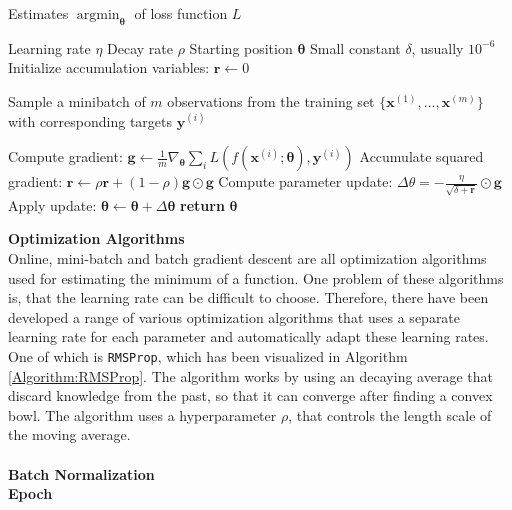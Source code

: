 \documentclass[main.tex]{subfiles}
\begin{document}
\begin{algorithm}[h]
    \caption{Estimates $\operatorname*{argmin}_{\bm{\theta}}$ of loss function $L$ \cite{DeepLearning}}
    \label{Algorithm:RMSProp}
    \begin{algorithmic}[1]
        \Require Learning rate $\eta$
        \Require Decay rate $\rho$
        \Require Starting position $\bm{\theta}$
        \Require Small constant $\delta$, usually $10^{-6}$
        \State Initialize accumulation variables: $\bm{r} \gets 0$
            \State \begin{varwidth}[t]{\linewidth}
            Sample a minibatch of $m$ observations from the training set $\{\bm{x}^{(1)}, ..., \bm{x}^{(m)}\}$ with corresponding targets $\bm{y}^{(i)}$
            \end{varwidth}
            \State Compute gradient: $\bm{g} \gets \frac{1}{m} \nabla_{\bm{\theta}} \sum_i L(f(\bm{x}^{(i)}; \bm{\theta}), \bm{y}^{(i)})$
            \State Accumulate squared gradient: $\bm{r} \gets \rho \bm{r} + (1 - \rho) \bm{g} \odot \bm{g}$
            \State Compute parameter update: $\Delta\theta = - \frac{\eta}{\sqrt{\delta + \bm{r}}} \odot \bm{g}$
            \State Apply update: $\bm{\theta} \gets \bm{\theta} + \Delta \bm{\theta}$ 
        \EndWhile
        \State \textbf{return} $\bm{\theta}$
        \EndProcedure
    \end{algorithmic}
\end{algorithm}
\noindent \textbf{Optimization Algorithms} \\
\noindent Online, mini-batch and batch gradient descent are all optimization algorithms used for estimating the minimum of a function. One problem of these algorithms is, that the learning rate can be difficult to choose. Therefore, there have been developed a range of various optimization algorithms that uses a separate learning rate for each parameter and automatically adapt these learning rates. One of which is \texttt{RMSProp}, which has been visualized in Algorithm \ref{Algorithm:RMSProp}. The algorithm works by using an decaying average that discard knowledge from the past, so that it can converge after finding a convex bowl. The algorithm uses a hyperparameter $\rho$, that controls the length scale of the moving average.
\\
\\
\textbf{Batch Normalization} \\
\textbf{Epoch} \\
\end{document}
